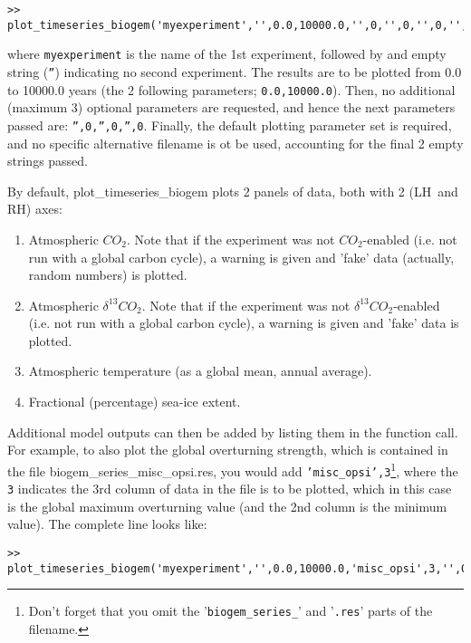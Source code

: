 \documentclass[11pt,fleqn]{book} %
\begin{document}
\begin{verbatim}
>> plot_timeseries_biogem('myexperiment','',0.0,10000.0,'',0,'',0,'',0,'','')
\end{verbatim}
where \texttt{myexperiment} is the name of the 1st experiment, followed by and empty string (\texttt{''}) indicating no second experiment. The results are to be plotted from 0.0 to 10000.0 years (the 2 following parameters; \texttt{0.0,10000.0}). Then, no additional (maximum 3) optional parameters are requested, and hence the next parameters passed are: \texttt{'',0,'',0,'',0}. Finally, the default plotting parameter set is required, and no specific alternative filename is ot be used, accounting for the final 2 empty strings passed.

By default, \textsf{\footnotesize plot\_timeseries\_biogem} plots 2 panels of data, both with 2 (LH\ and RH) axes:

\begin{enumerate}[noitemsep]
\vspace{1mm}
\item Atmospheric \(CO_{2}\). Note that if the experiment was not \(CO_{2}\)-enabled (i.e. not run with a global carbon cycle), a warning is given and 'fake' data (actually, random numbers) is plotted.
\vspace{1mm}
\item Atmospheric \(\delta ^{13}CO_{2}\). Note that if the experiment was not \(\delta ^{13}CO_{2}\)-enabled (i.e. not run with a global carbon cycle), a warning is given and 'fake' data is plotted.
\vspace{1mm}
\item Atmospheric temperature (as a global mean, annual average).
\vspace{1mm}
\item Fractional (percentage) sea-ice extent.
\end{enumerate}
\vspace{2mm}

Additional model outputs can then be added by listing them in the function call. For example, to also plot the global overturning strength, which is contained in the file \footnotesize\textsf{biogem\_series\_misc\_opsi.res}\normalsize, you would add \texttt{'misc\_opsi',3}\footnote{Don't forget that you omit the '\texttt{biogem\_series\_}' and '\texttt{.res}' parts of the filename.}, where the \texttt{3} indicates the 3rd column of data in the file is to be plotted, which in this case is the global maximum overturning value (and the 2nd column is the minimum value). The complete line looks like:
\small\begin{verbatim}
>> plot_timeseries_biogem('myexperiment','',0.0,10000.0,'misc_opsi',3,'',0,'',0,'','')
\end{verbatim}\normalsize
\end{document}
